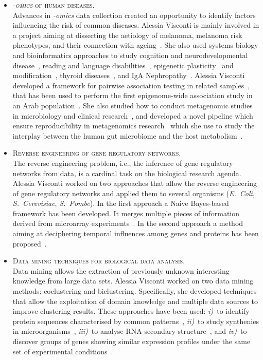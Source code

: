 \documentclass[a4paper,10pt]{article}
\newcommand{\smalltitle}[1]{
	\vspace{0.1cm}
	{\noindent 
	\large \textsc{#1}}
	\vspace{0.1cm}
}
\newcommand{\bulletitem}{\item[$\bullet$]}
\begin{document}
\begin{itemize}
	
\bulletitem \smalltitle{\emph{-omics} of human diseases.}\\
Advances in \emph{-omics} data collection created an opportunity to identify factors influencing the risk of common diseases. Alessia Visconti is mainly involved in a project aiming at dissecting the aetiology of melanoma, melanoma risk phenotypes, and their connection with ageing~\cite{Rib16,Pui16,Hys18,Vis18a,Duf17,Vis19a,Vis20,Swi15}. 
She also used systems biology and bioinformatics approaches to study cognition and neurodevelopmental disease~\cite{Joh15,Cul18}, reading and language disabilities~\cite{Gia16}, epigenetic plasticity~\cite{Car16} and modification~\cite{Zag18}, thyroid diseases~\cite{Mar20}, and IgA Nephropathy~\cite{Lom16}. Alessia Visconti developed a framework for pairwise association testing in related samples~\cite{Vis16}, that has been used to perform the first epigenome-wide association study in an Arab population~\cite{AlM15}. She also studied how to conduct metagenomic studies in microbiology and clinical research~\cite{Vis18c}, and developed a novel pipeline which ensure reproducibility in metagenomics research~\cite{Vis18b} which she use to study the interplay between the human gut microbiome and the host metabolism~\cite{Vis19}.
	
\bulletitem \smalltitle{Reverse engineering of gene regulatory networks.}\\
The reverse engineering problem, i.e., the inference of gene regulatory networks from data, is a cardinal task on the biological research agenda.
Alessia Visconti worked on two approaches that allow the reverse engineering of gene regulatory networks and applied them to several organisms (\emph{E.~Coli}, \emph{S.~Cerevisiae}, \emph{S.~Pombe}). In the first approach a Naive Bayes-based framework has been developed. It merges multiple pieces of information derived from microarray experiments~\cite{Mar12, Vis11b}. In the second approach a method aiming at deciphering temporal influences among genes and proteins has been proposed~\cite{Vis12b}. 

\bulletitem \smalltitle{Data mining techniques for biological data analysis.}\\
Data mining allows the extraction of previously unknown interesting knowledge from large data sets.
Alessia Visconti worked on two data mining methods: coclustering and biclustering. Specifically, she developed techniques that allow the exploitation of domain knowledge and multiple data sources to improve clustering results.
These approaches have been used: \emph{i)}~to identify protein sequences characterised by common patterns~\cite{Vis08, Cor09a, Cor08b}, \emph{ii)}~to study synthenies in microorganisms~\cite{Bon11}, \emph{iii)}~to analyse RNA secondary structure~\cite{Cor08a}, and \emph{iv)}~to discover groups of genes showing similar expression profiles under the same set of experimental conditions~\cite{Vis13a, Cor09b, Vis11c, Vis12b}.


\end{itemize}
\end{document}
